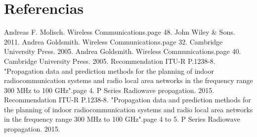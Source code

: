 \documentclass[preprint,12pt]{elsarticle}
\begin{document}



\section*{Referencias}
\begin{thebibliography}{9}
	 Andreas F. Molisch.
	Wireless Communications.page 48.
	John Wiley \& Sons. 2011.
	 Andrea Goldsmith.
	Wireless Communications.page 32.
	Cambridge University Press. 2005.
	 Andrea Goldsmith.
	Wireless Communications.page 40.
	Cambridge University Press. 2005.
	 Recommendation ITU-R P.1238-8.
	"Propagation data and prediction methods
	for the planning of indoor
	radiocommunication systems and
	radio local area networks in the
	frequency range 300 MHz to 100 GHz".page 4.
	P Series
	Radiowave propagation. 2015.
	 Recommendation ITU-R P.1238-8.
	"Propagation data and prediction methods
	for the planning of indoor
	radiocommunication systems and
	radio local area networks in the
	frequency range 300 MHz to 100 GHz".page 4 to 5.
	P Series
	Radiowave propagation. 2015.
\end{thebibliography}
\end{document}
